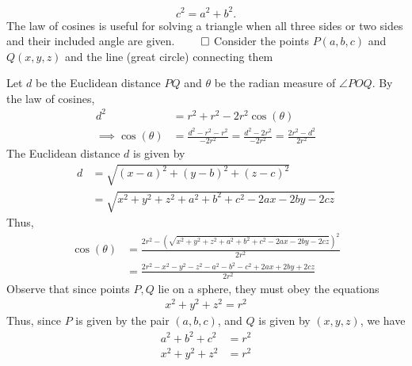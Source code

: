 \documentclass{report}
\begin{document}
\begin{itemize}
            \[
                c^2 = a^2 + b^2.
            \]
            The law of cosines is useful for solving a triangle when all three sides or two sides and their included angle are given. $\qed $
            \bigbreak \noindent 
            Consider the points $P(a,b,c)$ and $Q(x,y,z)$ and the line (great circle) connecting them
            \bigbreak \noindent 
            \begin{figure}[ht]
                \centering
                \label{fig:gc}
            \end{figure}
            \bigbreak \noindent 
            Let $d$ be the Euclidean distance $PQ$ and $\theta$ be the radian measure of $\angle POQ$. By the law of cosines,
            \begin{align*}
                d^{2} &= r^{2} + r^{2} - 2r^{2}\cos{\left(\theta \right)} \\
                \implies \cos{\left(\theta \right)} &= \frac{d^{2} - r^{2} - r^{2}}{-2r^{2}} = \frac{d^{2} - 2r^{2}}{-2r^{2}} = \frac{2r^{2}-d^{2}}{2r^{2}}
            \end{align*}
            The Euclidean distance $d$ is given by
            \begin{align*}
                d &= \sqrt{(x-a)^{2} + (y-b)^{2} + (z-c)^{2}} \\
                  &= \sqrt{x^{2} + y^{2} + z^{2} + a^{2} + b^{2} + c^{2} - 2ax -2by - 2cz}
            \end{align*}
            Thus,
            \begin{align*}
                \cos{\left(\theta \right)} &= \frac{2r^{2} - \left(\sqrt{x^{2} + y^{2} + z^{2} + a^{2} + b^{2} + c^{2} - 2ax -2by - 2cz}\right)^{2}}{2r^{2}} \\
                                           &= \frac{2r^{2} -x^{2}-y^{2}-z^{2}-a^{2}-b^{2}-c^{2}+2ax+2by+2cz}{2r^{2}}
            \end{align*}
            Observe that since points $P,Q$ lie on a sphere, they must obey the equations
            \begin{align*}
                x^{2} + y^{2} + z^{2} = r^{2}
            \end{align*}
            Thus, since $P$ is given by the pair $(a,b,c)$, and $Q$ is given by $(x,y,z)$, we have
            \begin{align*}
                a^{2} +b^{2} + c^{2} &=r^{2} \\
                x^{2} + y^{2} + z^{2} &= r^{2}
            \end{align*}

\end{itemize}
\end{document}

